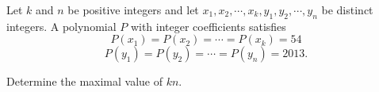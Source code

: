 Let $k$ and $n$ be positive integers and let $x_1, x_2, \cdots, x_k, y_1, y_2, \cdots, y_n$ be distinct integers. A polynomial $P$ with integer coefficients satisfies\[P(x_1)=P(x_2)= \cdots = P(x_k)=54\]\[P(y_1)=P(y_2)= \cdots = P(y_n)=2013.\]

Determine the maximal value of $kn$.